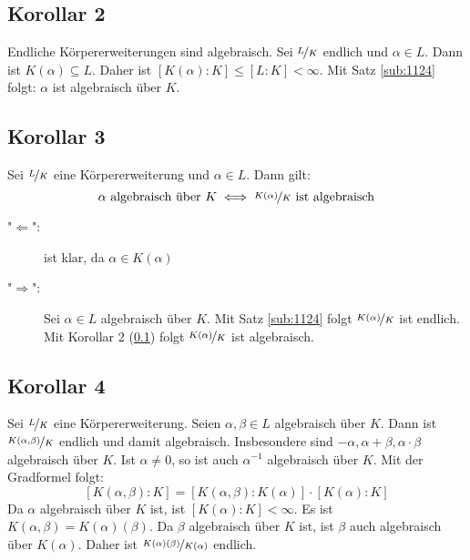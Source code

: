 \subsection[Korollar 2: Endliche Körpererweiterungen sind algebraisch]{Korollar 2} %
\label{sub:1126}
Endliche Körpererweiterungen sind algebraisch.
Sei $\nicefrac{L}{K}$ endlich und $\alpha \in L$. Dann ist $K(\alpha) \subseteq L$. Daher ist $[K(\alpha) :K] \le [L :K] < \infty$. Mit Satz \ref{sub:1124} folgt:
$\alpha$ ist algebraisch über $K$. \bewende

\subsection[Korollar 3: Äquivalenz zu $\alpha$ algebraisch]{Korollar 3} %
\label{sub:1127}
Sei $\nicefrac{L}{K}$ eine Körpererweiterung und $\alpha \in L$. Dann gilt:
\[
	\alpha \text{ algebraisch über }K \iff \nicefrac{K(\alpha)}{K} \text{ ist algebraisch}
\]
\begin{description}
	\item["$\Leftarrow$"{}:] ist klar, da $\alpha \in K(\alpha)$
	\item["$\Rightarrow $":] Sei $\alpha \in L$ algebraisch über $K$. Mit Satz \ref{sub:1124} folgt $\nicefrac{K(\alpha)}{K}$ ist endlich. Mit Korollar 2 (\ref{sub:1126}) 
	folgt $\nicefrac{K(\alpha)}{K}$ ist algebraisch. \bewende
\end{description}

\subsection[Korollar 4: Summen, Produkte und Inverse algebraische Elemente sind wieder algebraisch]{Korollar 4} %
\label{sub:1128}
Sei $\nicefrac{L}{K}$ eine Körpererweiterung. Seien $\alpha, \beta \in L$ algebraisch über $K$. Dann ist $\nicefrac{K(\alpha, \beta)}{K}$ endlich und damit algebraisch.
Insbesondere sind $-\alpha, \alpha+\beta, \alpha \cdot \beta$ algebraisch über $K$. Ist $\alpha\not= 0$, so ist auch $\alpha ^{-1}$ algebraisch über $K$.
Mit der Gradformel folgt:
\[
	[K(\alpha, \beta) : K] = [K(\alpha, \beta) : K(\alpha)] \cdot [K(\alpha) :K]
\]
Da $\alpha$ algebraisch über $K$ ist, ist $[K(\alpha) :K] < \infty$. Es ist $K(\alpha, \beta)= K(\alpha)(\beta)$. Da $\beta$ algebraisch über $K$ ist, ist $\beta$ auch
algebraisch über $K(\alpha)$. Daher ist $\nicefrac{K(\alpha)(\beta)}{K(\alpha)}$ endlich. \bewende

